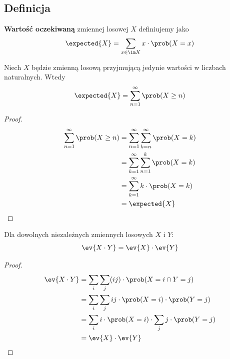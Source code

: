 \subsection{Definicja}
\begin{definition}
	\textbf{Wartość oczekiwaną} zmiennej losowej \( X \) definiujemy jako
	\[
		\expected{X} = \sum_{x \in \im X} x \cdot \prob(X = x)
	\]
\end{definition}

\begin{theorem}[Lemat 2.9 P\&C]
	\label{expected-value-of-natural-random-variable}
	Niech \( X \) będzie zmienną losową przyjmującą jedynie wartości w liczbach naturalnych. Wtedy
	\[
		\expected{X} = \sum_{n=1}^\infty \prob(X \geq n)
	\]
\end{theorem}
\begin{proof}
	\begin{align*}
		\sum_{n=1}^\infty \prob(X \geq n)
		 & = \sum_{n=1}^\infty \sum_{k=n}^\infty \prob(X = k) \\
		 & = \sum_{k=1}^\infty \sum_{n=1}^k \prob(X = k)      \\
		 & = \sum_{k=1}^\infty k \cdot \prob(X = k)           \\
		 & = \expected{X}
	\end{align*}
\end{proof}

\begin{theorem} Dla dowolnych niezależnych zmiennych losowych \(X\) i \(Y\):
	\label{ev-of-independent-variable-product}
	\[
		\ev{X \cdot Y} = \ev{X} \cdot \ev{Y}
	\]
\end{theorem}
\begin{proof}
	\begin{align*}
		\ev{X \cdot Y} &= \sum_i \sum_j (ij) \cdot \prob(X = i \cap Y = j) \\
		&= \sum_i \sum_j ij \cdot \prob(X = i) \cdot \prob(Y = j) \\
		&= \sum_i i \cdot \prob(X = i) \cdot \sum_j j \cdot \prob(Y = j) \\
		&= \ev{X} \cdot \ev{Y}
	\end{align*}
\end{proof}


